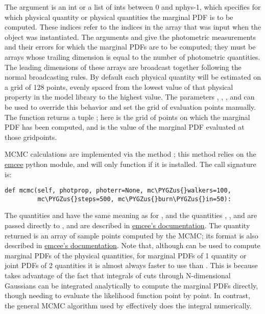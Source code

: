 \documentclass[letterpaper,10pt,english]{sphinxmanual}
\def\PYGZus{\char`\_}
\begin{document}
The argument  is an int or a list of ints between 0 and nphys-1, which specifies for which physical quantity or physical quantities the marginal PDF is to be computed. These indices refer to the indices in the  array that was input when the  object was instantiated. The arguments  and  give the photometric measurements and their errors for which the marginal PDFs are to be computed; they must be arrays whose trailing dimension is equal to the number of photometric quantities. The leading dimensions of these arrays are broadcast together following the normal broadcasting rules. By default each physical quantity will be estimated on a grid of 128 points, evenly spaced from the lowest value of that physical property in the model library to the highest value. The parameters , , , and  can be used to override this behavior and set the grid of evaluation points manually. The function returns a tuple ; here  is the grid of points on which the marginal PDF has been computed, and  is the value of the marginal PDF evaluated at those gridpoints.

MCMC calculations are implemented via the method ; this method relies on the \href{http://dan.iel.fm/emcee/current/}{emcee} python module, and will only function if it is installed. The call signature is:

\begin{Verbatim}[commandchars=\\\{\}]
def mcmc(self, photprop, photerr=None, mc\PYGZus{}walkers=100,
         mc\PYGZus{}steps=500, mc\PYGZus{}burn\PYGZus{}in=50):
\end{Verbatim}

The quantities  and  have the same meaning as for , and the quantities , , and  are passed directly to , and are described in \href{http://dan.iel.fm/emcee/current/}{emcee's documentation}. The quantity returned is an array of sample points computed by the MCMC; its format is also described in \href{http://dan.iel.fm/emcee/current/}{emcee's documentation}. Note that, although  can be used to compute marginal PDFs of the physical quantities, for marginal PDFs of 1 quantity or joint PDFs of 2 quantities it is almost always faster to use  than . This is because  takes advantage of the fact that integrals of cuts through N-dimensional Gaussians can be integrated analytically to compute the marginal PDFs directly, though needing to evaluate the likelihood function point by point. In contrast, the general MCMC algorithm used by  effectively does the integral numerically.
\end{document}
